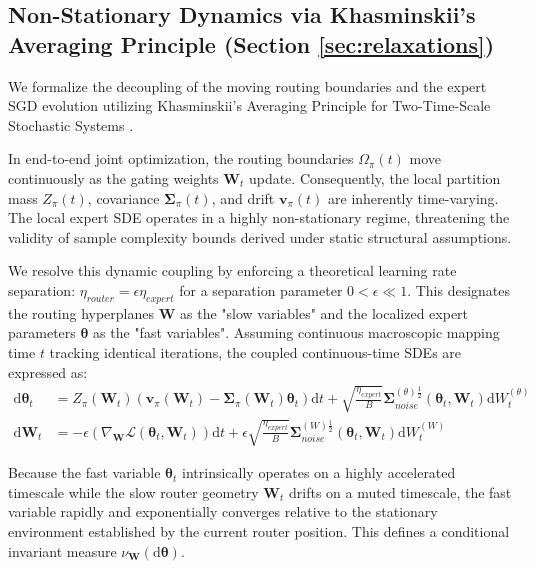 \documentclass{article}
\newcommand{\1}{\mathbb{I}}
\newcommand{\diff}{\mathrm{d}}
\newcommand{\Loss}{\mathcal{L}}
\newcommand{\bv}{\mathbf{v}}
\newcommand{\btheta}{\boldsymbol{\theta}}
\newcommand{\bW}{\mathbf{W}}
\newcommand{\bSigma}{\boldsymbol{\Sigma}}
\begin{document}
\subsection{Non-Stationary Dynamics via Khasminskii's Averaging Principle (Section \ref{sec:relaxations})}
\label{app:defense_ttsa}

We formalize the decoupling of the moving routing boundaries and the expert SGD evolution utilizing Khasminskii's Averaging Principle for Two-Time-Scale Stochastic Systems \citep{khasminskii1966stochastic, borkar1997stochastic}.

In end-to-end joint optimization, the routing boundaries $\Omega_\pi(t)$ move continuously as the gating weights $\bW_t$ update. Consequently, the local partition mass $Z_\pi(t)$, covariance $\bSigma_\pi(t)$, and drift $\bv_\pi(t)$ are inherently time-varying. The local expert SDE operates in a highly non-stationary regime, threatening the validity of sample complexity bounds derived under static structural assumptions.

We resolve this dynamic coupling by enforcing a theoretical learning rate separation: $\eta_{router} = \epsilon \eta_{expert}$ for a separation parameter $0 < \epsilon \ll 1$. This designates the routing hyperplanes $\bW$ as the "slow variables" and the localized expert parameters $\btheta$ as the "fast variables". Assuming continuous macroscopic mapping time $t$ tracking identical iterations, the coupled continuous-time SDEs are expressed as:
\begin{align}
    \diff \btheta_t &= Z_\pi(\bW_t) \left( \bv_\pi(\bW_t) - \bSigma_\pi(\bW_t) \btheta_t \right) \diff t + \sqrt{\frac{\eta_{expert}}{B}} \bSigma_{noise}^{(\theta)\frac{1}{2}}(\btheta_t, \bW_t) \diff W_t^{(\theta)} \\
    \diff \bW_t &= -\epsilon \left( \nabla_{\bW} \Loss(\btheta_t, \bW_t) \right) \diff t + \epsilon \sqrt{\frac{\eta_{expert}}{B}} \bSigma_{noise}^{(W)\frac{1}{2}}(\btheta_t, \bW_t) \diff W_t^{(W)}
\end{align}

Because the fast variable $\btheta_t$ intrinsically operates on a highly accelerated timescale while the slow router geometry $\bW_t$ drifts on a muted timescale, the fast variable rapidly and exponentially converges relative to the stationary environment established by the current router position. This defines a conditional invariant measure $\nu_{\bW}(\diff \btheta)$.
\end{document}
